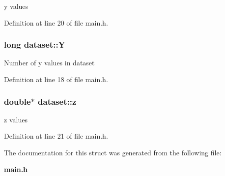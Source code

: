 y values 

Definition at line 20 of file main.h.
\subsubsection{\setlength{\rightskip}{0pt plus 5cm}long {\bf dataset::Y}}\label{structdataset_o1}


Number of y values in dataset 

Definition at line 18 of file main.h.
\subsubsection{\setlength{\rightskip}{0pt plus 5cm}double$\ast$ {\bf dataset::z}}\label{structdataset_o4}


z values 

Definition at line 21 of file main.h.

The documentation for this struct was generated from the following file:\begin{CompactItemize}
\item 
{\bf main.h}\end{CompactItemize}
